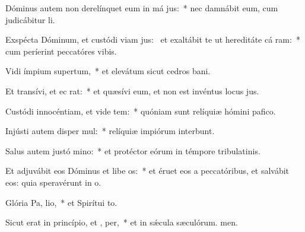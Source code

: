 \item Dóminus autem non derelínquet eum in má jus:~* nec damnábit eum, cum judicábitur li.
\item Exspécta Dóminum, et custódi viam jus:~\pscross{} et exaltábit te ut hereditáte cá ram:~* cum períerint peccatóres vibis.
\item Vidi ímpium supertum,~* et elevátum sicut cedros bani.
\item Et transívi, et ec  rat:~* et quæsívi eum, et non est invéntus locus jus.
\item Custódi innocéntiam, et vide tem:~* quóniam sunt relíquiæ hómini pafico.
\item Injústi autem disper mul:~* relíquiæ impiórum interbunt.
\item Salus autem justó  mino:~* et protéctor eórum in témpore tribulatinis.
\item Et adjuvábit eos Dóminus et libe os:~* et éruet eos a peccatóribus, et salvábit eos: quia speravérunt in o.
\item Glória Pa,  lio,~* et Spirítui to.
\item Sicut erat in princípio, et ,  per,~* et in sǽcula sæculórum. men.
